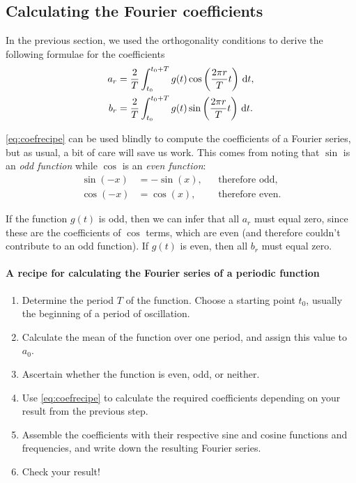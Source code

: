 \documentclass[11pt,twoside,a4paper]{article}
\begin{document}
\subsection{Calculating the Fourier coefficients} 
In the previous section, we used the orthogonality conditions to
derive the following formulae for the coefficients
\begin{subequations}
  \label{eq:coefrecipe}
  \begin{align}
    a_r &= \frac{2}{T}\int_{t_0}^{t_0+T}g(t)
      \cos\left(\frac{2\pi r}{T}t\right)\,\textrm{d} t, \\
    b_r &= \frac{2}{T}\int_{t_0}^{t_0+T}g(t)
      \sin\left(\frac{2\pi r}{T}t\right)\,\textrm{d} t.
  \end{align}
\end{subequations}

\autoref{eq:coefrecipe} can be used blindly to compute the
coefficients of a Fourier series, but as usual, a bit of care will
save us work.  This comes from noting that $\sin$ is an \textit{odd
  function} while $\cos$ is an \textit{even function}:
\begin{align}
  \sin(-x) &= -\sin(x), & &\text{therefore odd},\nonumber\\
  \cos(-x) &= \cos(x),  & &\text{therefore even}.\nonumber
\end{align}

If the function $g(t)$ is odd, then we can infer that all $a_r$ must
equal zero, since these are the coefficients of $\cos$ terms, which
are even (and therefore couldn't contribute to an odd function).  If
$g(t)$ is even, then all $b_r$ must equal zero.

\paragraph{A recipe for calculating the Fourier series of a periodic
  function}
\begin{enumerate}
\item Determine the period $T$ of the function. Choose a starting
  point $t_0$, usually the beginning of a period of oscillation.
\item Calculate the mean of the function over one period, and assign
  this value to $a_0$.
\item Ascertain whether the function is even, odd, or neither.
\item Use \autoref{eq:coefrecipe} to calculate the required
  coefficients depending on your result from the previous step.
\item Assemble the coefficients with their respective sine and cosine
  functions and frequencies, and write down the resulting Fourier
  series. 
\item Check your result!
\end{enumerate}
\end{document}
